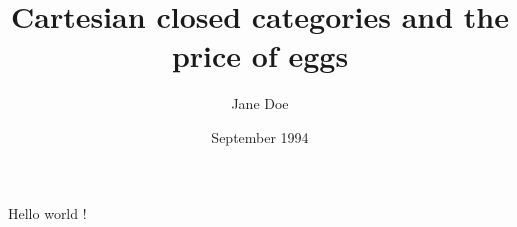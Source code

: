 \documentclass{article}
\title{Cartesian closed categories and the price of eggs}
\author{Jane Doe}
\date{September 1994}
\begin{document}
    \maketitle
    Hello world !
 
\end{document}
